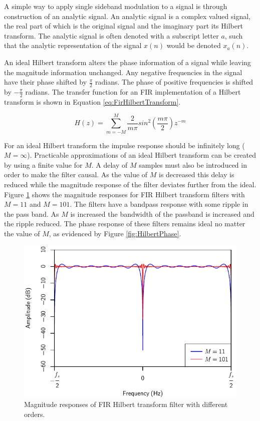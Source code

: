 		A simple way to apply single sideband modulation to a signal is through construction of an analytic signal.
		An analytic signal is a complex valued signal, the real part of which is the original signal and the
		imaginary part its Hilbert transform. The analytic signal is often denoted with a subscript letter
		$a$, such that the analytic representation of the signal $x(n)$ would be denoted $x_{a}(n)$.

		An ideal Hilbert transform alters the phase information of a signal while leaving the magnitude information
		unchanged. Any negative frequencies in the signal have their phase shifted by $\frac{\pi}{2}$ radians.  The
		phase of positive frequencies is shifted by $-\frac{\pi}{2}$ radians. The transfer function for an FIR
		implementation of a Hilbert transform is shown in Equation \ref{eq:FirHilbertTransform}.

		\begin{equation}
			H(z) = \sum_{m = -M}^{M} \frac{2}{m\pi} sin^{2} \left( \frac{m\pi}{2} \right) z^{-m}
			\label{eq:FirHilbertTransform}
		\end{equation}

		For an ideal Hilbert transform the impulse response should be infinitely long ($M = \infty$). Practicable
		approximations of an ideal Hilbert transform can be created by using a finite value for $M$. A delay of $M$
		samples must also be introduced in order to make the filter causal. As the value of $M$ is decreased this
		delay is reduced while the magnitude response of the filter deviates further from the ideal. Figure
		\ref{fig:HilbertMagnitude} shows the magnitude responses for FIR Hilbert transform filters with $M = 11$
		and $M = 101$. The filters have a bandpass response with some ripple in the pass band. As $M$ is increased
		the bandwidth of the passband is increased and the ripple reduced. The phase response of these filters
		remains ideal no matter the value of $M$, as evidenced by Figure \ref{fig:HilbertPhase}.

		\begin{figure}[h!]
			\centering
			\includegraphics{chapter3/Images/HilbertMagnitudeResponses.pdf}
			\caption{Magnitude responses of FIR Hilbert transform filter with different orders.}
			\label{fig:HilbertMagnitude}
		\end{figure}

